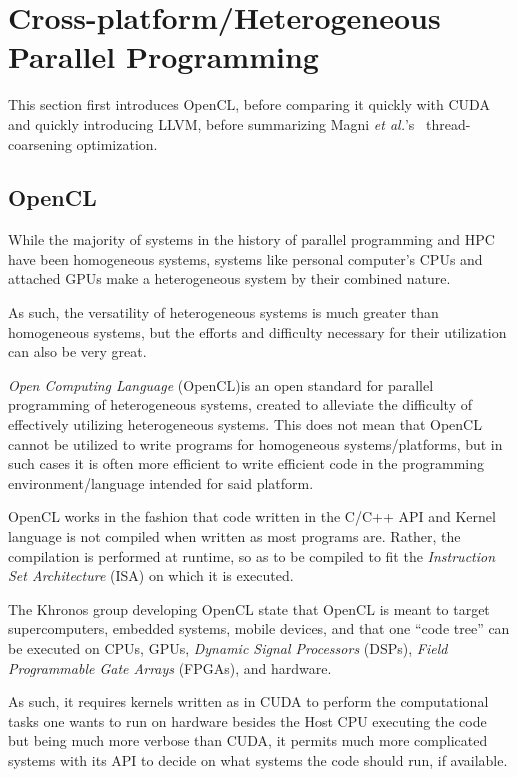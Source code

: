
\section{Cross-platform/Heterogeneous Parallel Programming}
\label{sec:opencl}

This section first introduces OpenCL, before comparing it quickly with CUDA and quickly introducing LLVM, before summarizing Magni \textit{et al.}'s~\cite{Magni:2013:LCE:2503210.2503268} thread-coarsening optimization.

\subsection{OpenCL}

While the majority of systems in the history of parallel programming and HPC have been homogeneous systems, systems like personal computer's CPUs and attached GPUs make a heterogeneous system by their combined nature.

As such, the versatility of heterogeneous systems is much greater than homogeneous systems, but the efforts and difficulty necessary for their utilization can also be very great.

\textit{Open Computing Language} (OpenCL)\texttrademark is an open standard for parallel programming of heterogeneous systems, created to alleviate the difficulty of effectively utilizing heterogeneous systems.
This does not mean that OpenCL cannot be utilized to write programs for homogeneous systems/platforms, but in such cases it is often more efficient to write efficient code in the programming environment/language intended for said platform.

OpenCL works in the fashion that code written in the C/C++ API and Kernel language is not compiled when written as most programs are.
Rather, the compilation is performed at runtime, so as to be compiled to fit the \textit{Instruction Set Architecture} (ISA) on which it is executed.

The Khronos group developing OpenCL state that OpenCL is meant to target supercomputers, embedded systems, mobile devices, and that one ``code tree'' can be executed on CPUs, GPUs, \textit{Dynamic Signal Processors} (DSPs), \textit{Field Programmable Gate Arrays} (FPGAs), and hardware.

As such, it requires kernels written as in CUDA to perform the computational tasks one wants to run on hardware besides the Host CPU executing the code but being much more verbose than CUDA, it permits much more complicated systems with its API to decide on what systems the code should run, if available.

